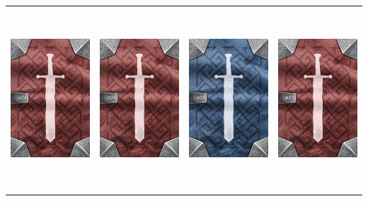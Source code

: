 \documentclass{minimal}
\begin{document}
{\begin{longtable}{llll}
\includegraphics[width=44mm,height=68mm]{./64-151/gh-074b-swordedge-armor-back.png} &
\includegraphics[width=44mm,height=68mm]{./64-151/gh-074b-swordedge-armor-back.png} &
\includegraphics[width=44mm,height=68mm]{./64-151/gh-074a-swordedge-armor-back.png} &
\includegraphics[width=44mm,height=68mm]{./64-151/gh-073b-blinking-cape-back.png}\\ 

\end{longtable}}
\end{document}
